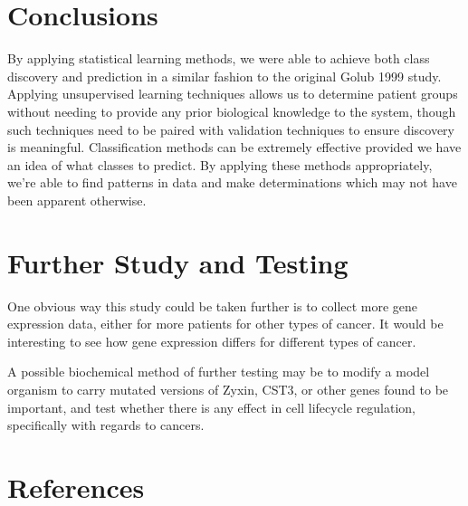\documentclass{article}
\begin{document}
\section{Conclusions}

By applying statistical learning methods, we were able to achieve both
class discovery and prediction in a similar fashion to the original
Golub 1999 study. Applying unsupervised learning techniques allows us
to determine patient groups without needing to provide any prior
biological knowledge to the system, though such techniques need to be
paired with validation techniques to ensure discovery is
meaningful. Classification methods can be extremely effective provided
we have an idea of what classes to predict. By applying these methods
appropriately, we're able to find patterns in data and make
determinations which may not have been apparent otherwise.


\section{Further Study and Testing}

One obvious way this study could be taken further is to collect more
gene expression data, either for more patients for other types of
cancer. It would be interesting to see how gene expression differs for
different types of cancer.

A possible biochemical method of further testing may be to modify a
model organism to carry mutated versions of Zyxin, CST3, or other
genes found to be important, and test whether there is any effect in
cell lifecycle regulation, specifically with regards to cancers.

\section{References}

\printbibliography
\end{document}
